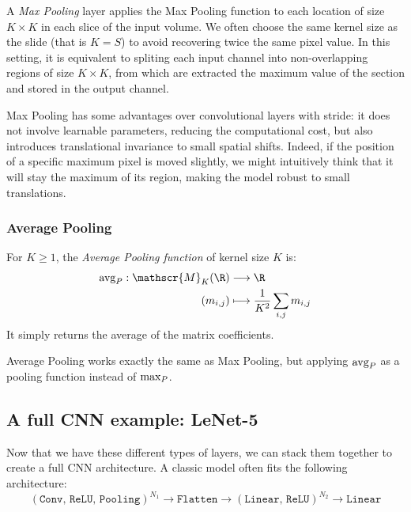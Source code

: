 A \emph{Max Pooling} layer applies the Max Pooling function to each location of size $K\times K$ in each slice of the input volume. We often choose the same kernel size as the slide (that is $K=S$) to avoid recovering twice the same pixel value. In this setting, it is equivalent to spliting each input channel into non-overlapping regions of size $K\times K$, from which are extracted the maximum value of the section and stored in the output channel.

Max Pooling has some advantages over convolutional layers with stride: it does not involve learnable parameters, reducing the computational cost, but also introduces translational invariance to small spatial shifts. Indeed, if the position of a specific maximum pixel is moved slightly, we might intuitively think that it will stay the maximum of its region, making the model robust to small translations.

\subsubsection{Average Pooling}
\begin{definition}
    For $K\geq 1$, the \emph{Average Pooling function} of kernel size $K$ is:
    \begin{equation*}
        \begin{aligned}
            \textnormal{avg}_P: \mathscr{M}_{K}(\R) &\longrightarrow \R\\
            (m_{i, j}) &\longmapsto \frac{1}{K^2}\sum_{i, j} m_{i, j}
        \end{aligned}
    \end{equation*}
    It simply returns the average of the matrix coefficients.
\end{definition}

Average Pooling works exactly the same as Max Pooling, but applying $\textnormal{avg}_P$ as a pooling function instead of $\textnormal{max}_P$.

\subsection{A full CNN example: LeNet-5}
Now that we have these different types of layers, we can stack them together to create a full CNN architecture. A classic model often fits the following architecture:
\begin{equation*}
    (\texttt{Conv, ReLU, Pooling})^{N_1} \rightarrow \texttt{Flatten} \rightarrow (\texttt{Linear, ReLU})^{N_2} \rightarrow \texttt{Linear}
\end{equation*}

